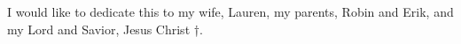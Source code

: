 I would like to dedicate this to my wife, Lauren, my parents, Robin and Erik, and my Lord and Savior, Jesus Christ †.

